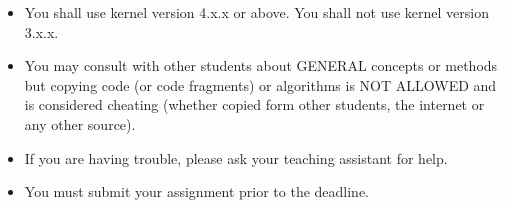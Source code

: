 \documentclass{article}
\begin{document}
\begin{itemize}
    \item You shall use kernel version 4.x.x or above. You shall not use kernel version 3.x.x.
    \item You may consult with other students about GENERAL concepts or methods but copying code (or code fragments) or algorithms is NOT ALLOWED and is considered cheating (whether copied form other students, the internet or any other source).
    \item If you are having trouble, please ask your teaching assistant for help.
    \item You must submit your assignment prior to the deadline.
\end{itemize}
\end{document}
